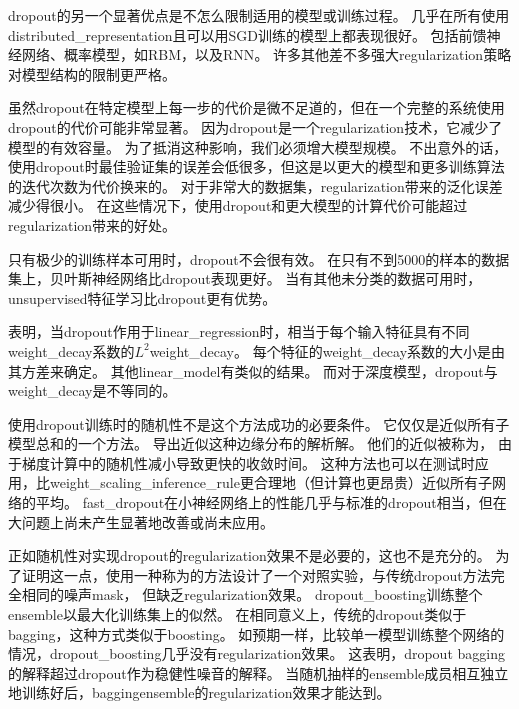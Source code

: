 
\gls{dropout}的另一个显著优点是不怎么限制适用的模型或训练过程。
几乎在所有使用\gls{distributed_representation}且可以用\gls{SGD}训练的模型上都表现很好。
包括前馈神经网络、概率模型，如\gls{RBM}\citep{Srivastava14}，以及\gls{RNN}\citep{Bayer-et-al-arXiv-2014,Pascanu-et-al-ICLR2014}。
许多其他差不多强大\gls{regularization}策略对模型结构的限制更严格。

虽然\gls{dropout}在特定模型上每一步的代价是微不足道的，但在一个完整的系统使用\gls{dropout}的代价可能非常显著。
因为\gls{dropout}是一个\gls{regularization}技术，它减少了模型的有效容量。
为了抵消这种影响，我们必须增大模型规模。
不出意外的话，使用\gls{dropout}时最佳验证集的误差会低很多，但这是以更大的模型和更多训练算法的迭代次数为代价换来的。
对于非常大的数据集，\gls{regularization}带来的泛化误差减少得很小。
在这些情况下，使用\gls{dropout}和更大模型的计算代价可能超过\gls{regularization}带来的好处。

只有极少的训练样本可用时，\gls{dropout}不会很有效。
在只有不到5000的样本的数据集上\citep{Xiong2011}，贝叶斯神经网络\citep{Neal1996}比\gls{dropout}表现更好\citep{Srivastava14}。
当有其他未分类的数据可用时，\gls{unsupervised}特征学习比\gls{dropout}更有优势。


\cite{Wager+al-2013}表明，当\gls{dropout}作用于\gls{linear_regression}时，相当于每个输入特征具有不同\gls{weight_decay}系数的$L^2$\gls{weight_decay}。 每个特征的\gls{weight_decay}系数的大小是由其方差来确定。
其他\gls{linear_model}有类似的结果。
而对于深度模型，\gls{dropout}与\gls{weight_decay}是不等同的。


使用\gls{dropout}训练时的随机性不是这个方法成功的必要条件。
它仅仅是近似所有子模型总和的一个方法。
\cite{WangManning-ICML2013-small}导出近似这种边缘分布的解析解。
他们的近似被称为， 由于梯度计算中的随机性减小导致更快的收敛时间。
这种方法也可以在测试时应用，比\gls{weight_scaling_inference_rule}更合理地（但计算也更昂贵）近似所有子网络的平均。
\gls{fast_dropout}在小神经网络上的性能几乎与标准的\gls{dropout}相当，但在大问题上尚未产生显著地改善或尚未应用。


正如随机性对实现\gls{dropout}的\gls{regularization}效果不是必要的，这也不是充分的。
为了证明这一点，\cite{WardeFarley+al-ICLR2014}使用一种称为的方法设计了一个对照实验，与传统\gls{dropout}方法完全相同的噪声\gls{mask}， 但缺乏\gls{regularization}效果。
\gls{dropout_boosting}训练整个\gls{ensemble}以最大化训练集上的似然。
在相同意义上，传统的\gls{dropout}类似于\gls{bagging}，这种方式类似于\gls{boosting}。
如预期一样，比较单一模型训练整个网络的情况，\gls{dropout_boosting}几乎没有\gls{regularization}效果。
这表明，\gls{dropout} \gls{bagging}的解释超过\gls{dropout}作为稳健性噪音的解释。
当随机抽样的\gls{ensemble}成员相互独立地训练好后，\gls{bagging}\gls{ensemble}的\gls{regularization}效果才能达到。

